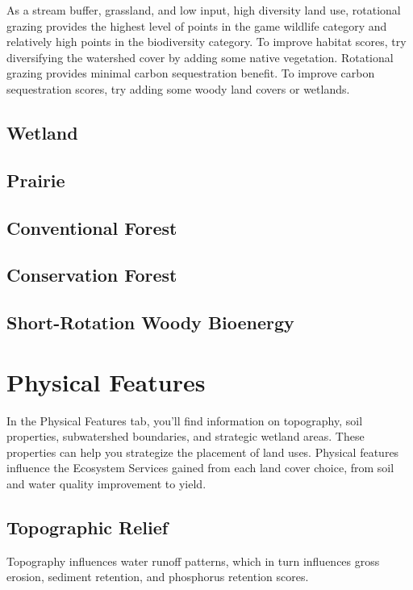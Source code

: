 \documentclass[11pt]{article}
\begin{document}
As a stream buffer, grassland, and low input, high diversity land use, rotational grazing provides the highest level of points in the game wildlife category and relatively high points in the biodiversity category. To improve habitat scores, try diversifying the watershed cover by adding some native vegetation. Rotational grazing provides minimal carbon sequestration benefit.  To improve carbon sequestration scores, try adding some woody land covers or wetlands.

\subsection{Wetland}

\subsection{Prairie}

\subsection{Conventional Forest}

\subsection{Conservation Forest}

\subsection{Short-Rotation Woody Bioenergy}


\newpage
\section{Physical Features}\label{sec:physicalfeatures}
In the Physical Features tab, you'll find information on topography, soil properties, subwatershed boundaries, and strategic wetland areas. These properties can help you strategize the placement of land uses. Physical features influence the Ecosystem Services gained from each land cover choice, from soil and water quality improvement to yield.

\subsection{Topographic Relief}

Topography influences water runoff patterns, which in turn influences gross erosion, sediment retention, and phosphorus retention scores.
\end{document}
